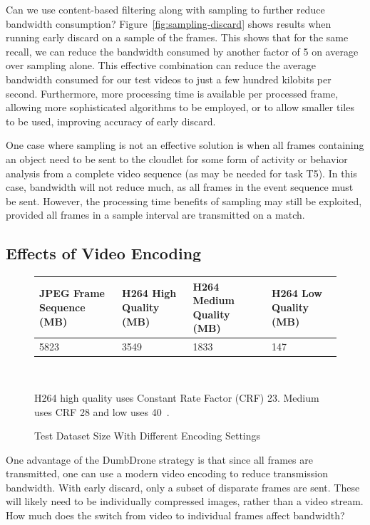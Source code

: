 Can we use content-based filtering along with sampling to further
reduce bandwidth consumption?  Figure~\ref{fig:sampling-discard}
shows results when running early discard on a sample of the
frames. This shows that for the same recall, we can reduce the
bandwidth consumed by another factor of 5 on average over sampling alone.
This effective combination can reduce the average bandwidth
consumed for our test videos to just a few hundred kilobits
per second.  Furthermore, more processing time is available per
processed frame, allowing more sophisticated algorithms to be
employed, or to allow smaller tiles to be used, improving
accuracy of early discard.  

One case where sampling is not an effective solution is when all
frames containing an object need to be sent to the cloudlet for
some form of activity or behavior analysis from a complete video
sequence (as may be needed for task T5).  In this case, bandwidth
will not reduce much, as all frames in the event sequence must be
sent.  However, the processing time benefits of sampling may
still be exploited, provided all frames in a sample interval are
transmitted on a match.  


\subsection{Effects of Video Encoding}

\begin{figure}
\centering
\begin{tabular}{|p{1.5cm}|p{1.3cm}|p{1.3cm}|p{1.3cm}|}
\hline
JPEG Frame Sequence (MB)  & H264 High Quality (MB)       & H264 Medium Quality (MB) & H264 Low Quality (MB)\\
\hline
5823 & 3549  & 1833 & 147\\
\hline
\end{tabular}\\
\vspace{0.1in}
\begin{captiontext}
H264 high quality uses Constant Rate Factor (CRF) 23. Medium
uses CRF 28 and low uses 40~\cite{Merritt2007}.
\end{captiontext}
\caption{Test Dataset Size With Different Encoding Settings}
\label{fig:video-vs-images}
\end{figure}


One advantage of the {\xc DumbDrone} strategy is that since all
frames are transmitted, one can use a modern video encoding to
reduce transmission bandwidth.  With early discard, only a subset
of disparate frames are sent.  These will likely need to be
individually compressed images, rather than a video stream.  How
much does the switch from video to individual frames affect
bandwidth?  


